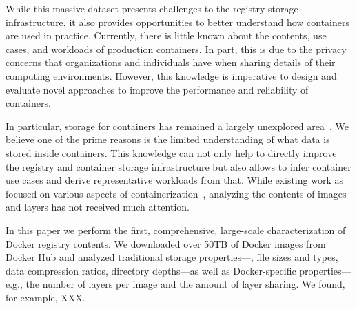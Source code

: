 While this massive dataset presents challenges to the registry storage
infrastructure, it also provides opportunities to better understand how
containers are used in practice.
%
Currently, there is little known about the contents, use cases, and workloads
of production containers.
%
In part, this is due to the privacy concerns that organizations and individuals
have when sharing details of their computing environments.
%
However, this knowledge is imperative to design and evaluate novel approaches
to improve the performance and reliability of containers.




In particular, storage for containers has remained a largely unexplored
area~\cite{login-container-storage-options}.
%
We believe one of the prime reasons is the limited understanding of what data
is stored inside containers.
%
This knowledge can not only help to directly improve the registry and container
storage infrastructure but also allows to infer container use cases and derive
representative workloads from that.
%
While existing work as focused on various aspects of
containerization~\cite{prev-work-1, prev-work-2, prev-work-3}, analyzing the
contents of images and layers has not received much attention.




%
%
%


%




In this paper we perform the first, comprehensive, large-scale characterization of
Docker registry contents.
%
We downloaded over 50TB of Docker images from Docker Hub and analyzed
traditional storage properties---\eg, file sizes and types, data compression
ratios, directory depths---as well as Docker-specific properties---e.g., the number
of layers per image and the amount of layer sharing.
%
%
We found, for example, XXX.
%

